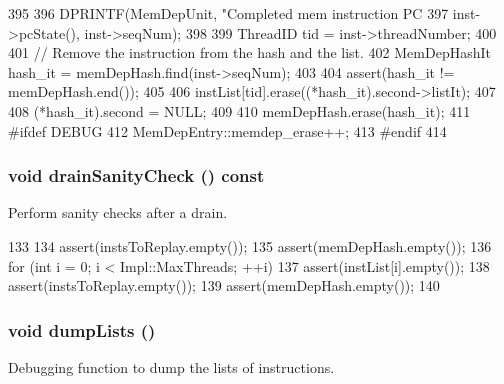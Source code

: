 \begin{DoxyCode}
395 {
396     DPRINTF(MemDepUnit, "Completed mem instruction PC %
397             inst->pcState(), inst->seqNum);
398 
399     ThreadID tid = inst->threadNumber;
400 
401     // Remove the instruction from the hash and the list.
402     MemDepHashIt hash_it = memDepHash.find(inst->seqNum);
403 
404     assert(hash_it != memDepHash.end());
405 
406     instList[tid].erase((*hash_it).second->listIt);
407 
408     (*hash_it).second = NULL;
409 
410     memDepHash.erase(hash_it);
411 #ifdef DEBUG
412     MemDepEntry::memdep_erase++;
413 #endif
414 }
\end{DoxyCode}
\hypertarget{classMemDepUnit_a0240eb42fa57fe5d3788093f62b77347}{
\subsubsection[{drainSanityCheck}]{\setlength{\rightskip}{0pt plus 5cm}void drainSanityCheck () const}}
\label{classMemDepUnit_a0240eb42fa57fe5d3788093f62b77347}
Perform sanity checks after a drain. 


\begin{DoxyCode}
133 {
134     assert(instsToReplay.empty());
135     assert(memDepHash.empty());
136     for (int i = 0; i < Impl::MaxThreads; ++i)
137         assert(instList[i].empty());
138     assert(instsToReplay.empty());
139     assert(memDepHash.empty());
140 }
\end{DoxyCode}
\hypertarget{classMemDepUnit_a3d1dae45e8e0b5cf7c1f4f8c796d070e}{
\subsubsection[{dumpLists}]{\setlength{\rightskip}{0pt plus 5cm}void dumpLists ()}}
\label{classMemDepUnit_a3d1dae45e8e0b5cf7c1f4f8c796d070e}
Debugging function to dump the lists of instructions. 


